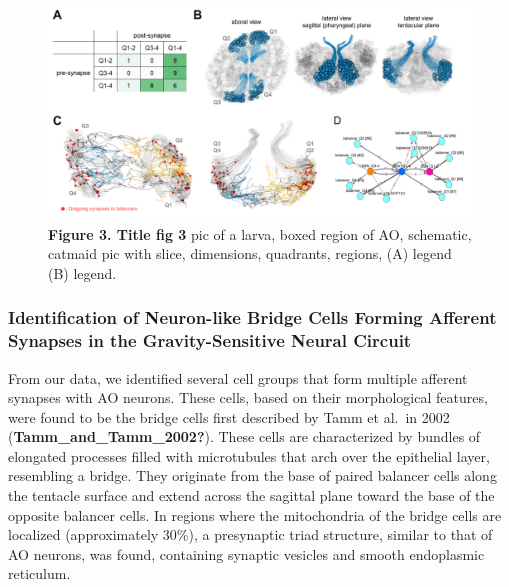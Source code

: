 \documentclass[
  11pt,
]{article}
\begin{document}
\begin{figure}[H]

{\centering \includegraphics[width=1\textwidth,height=\textheight]{figures/Figure3.png}

}

\caption{\textbf{Figure 3. Title fig 3} pic of a larva, boxed region of
AO, schematic, catmaid pic with slice, dimensions, quadrants, regions,
(A) legend (B) legend.}

\end{figure}%

\subsubsection{Identification of Neuron-like Bridge Cells Forming
Afferent Synapses in the Gravity-Sensitive Neural
Circuit}\label{identification-of-neuron-like-bridge-cells-forming-afferent-synapses-in-the-gravity-sensitive-neural-circuit}

From our data, we identified several cell groups that form multiple
afferent synapses with AO neurons. These cells, based on their
morphological features, were found to be the bridge cells first
described by Tamm et al.~in 2002 (\textbf{Tamm\_and\_Tamm\_2002?}).
These cells are characterized by bundles of elongated processes filled
with microtubules that arch over the epithelial layer, resembling a
bridge. They originate from the base of paired balancer cells along the
tentacle surface and extend across the sagittal plane toward the base of
the opposite balancer cells. In regions where the mitochondria of the
bridge cells are localized (approximately 30\%), a presynaptic triad
structure, similar to that of AO neurons, was found, containing synaptic
vesicles and smooth endoplasmic reticulum.
\end{document}
